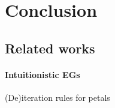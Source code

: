 

\section{Conclusion}

\subsection{Related works}

\paragraph{Intuitionistic EGs}
  
\begin{marginfigure}
  \caption{(De)iteration rules for petals}
\end{marginfigure}

